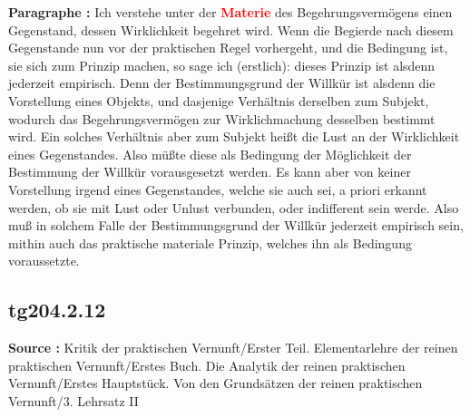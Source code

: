 \documentclass[a4paper,12pt,twoside]{book}
\newcommand{\match}[1]{\textcolor{red}{\textbf{#1}}}
\begin{document}
	\noindent\textbf{Paragraphe : }Ich verstehe unter der \match{Materie} des Begehrungsvermögens einen Gegenstand, dessen Wirklichkeit begehret wird. Wenn  die Begierde nach diesem Gegenstande nun vor der praktischen Regel vorhergeht, und die Bedingung ist, sie sich zum Prinzip machen, so sage ich (erstlich): dieses Prinzip ist alsdenn jederzeit empirisch. Denn der Bestimmungsgrund der Willkür ist alsdenn die Vorstellung eines Objekts, und dasjenige Verhältnis derselben zum Subjekt, wodurch das Begehrungsvermögen zur Wirklichmachung desselben bestimmt wird. Ein solches Verhältnis aber zum Subjekt heißt die Lust an der Wirklichkeit eines Gegenstandes. Also müßte diese als Bedingung der Möglichkeit der Bestimmung der Willkür vorausgesetzt werden. Es kann aber von keiner Vorstellung irgend eines Gegenstandes, welche sie auch sei, a priori erkannt werden, ob sie mit Lust oder Unlust verbunden, oder indifferent sein werde. Also muß in solchem Falle der Bestimmungsgrund der Willkür jederzeit empirisch sein, mithin auch das praktische materiale Prinzip, welches ihn als Bedingung voraussetzte. 
	
	\subsection*{tg204.2.12} 
	\textbf{Source : }Kritik der praktischen Vernunft/Erster Teil. Elementarlehre der reinen praktischen Vernunft/Erstes Buch. Die Analytik der reinen praktischen Vernunft/Erstes Hauptstück. Von den Grundsätzen der reinen praktischen Vernunft/3. Lehrsatz II\\  
	
\end{document}
